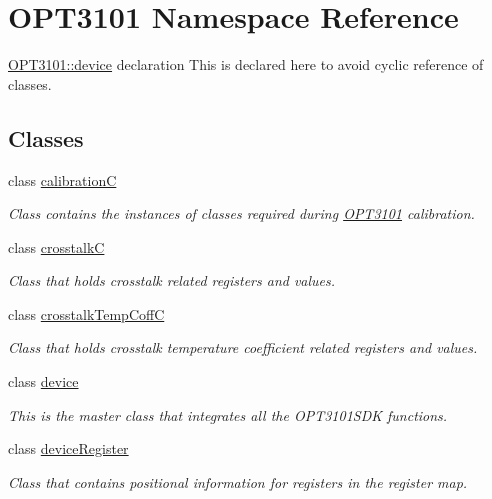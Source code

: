 \hypertarget{namespace_o_p_t3101}{}\section{O\+P\+T3101 Namespace Reference}
\label{namespace_o_p_t3101}


\mbox{\hyperlink{class_o_p_t3101_1_1device}{O\+P\+T3101\+::device}} declaration This is declared here to avoid cyclic reference of classes.  


\subsection*{Classes}
\begin{DoxyCompactItemize}
\item 
class \mbox{\hyperlink{class_o_p_t3101_1_1calibration_c}{calibrationC}}
\begin{DoxyCompactList}\small\item\em Class contains the instances of classes required during \mbox{\hyperlink{namespace_o_p_t3101}{O\+P\+T3101}} calibration. \end{DoxyCompactList}\item 
class \mbox{\hyperlink{class_o_p_t3101_1_1crosstalk_c}{crosstalkC}}
\begin{DoxyCompactList}\small\item\em Class that holds crosstalk related registers and values. \end{DoxyCompactList}\item 
class \mbox{\hyperlink{class_o_p_t3101_1_1crosstalk_temp_coff_c}{crosstalk\+Temp\+CoffC}}
\begin{DoxyCompactList}\small\item\em Class that holds crosstalk temperature coefficient related registers and values. \end{DoxyCompactList}\item 
class \mbox{\hyperlink{class_o_p_t3101_1_1device}{device}}
\begin{DoxyCompactList}\small\item\em This is the master class that integrates all the O\+P\+T3101\+S\+DK functions. \end{DoxyCompactList}\item 
class \mbox{\hyperlink{class_o_p_t3101_1_1device_register}{device\+Register}}
\begin{DoxyCompactList}\small\item\em Class that contains positional information for registers in the register map. \end{DoxyCompactList}\item 

\end{DoxyCompactItemize}
